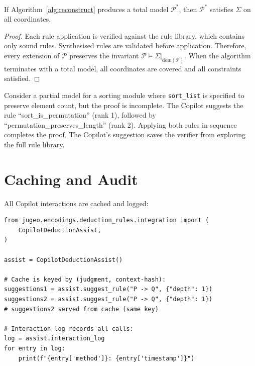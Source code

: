 \documentclass[11pt]{article}
\newcommand{\partmodel}{\mathcal{P}}
\begin{document}
\begin{theorem}\label{thm:recon-sound}
If Algorithm~\ref{alg:reconstruct} produces a total model $\partmodel^*$,
then $\partmodel^*$ satisfies $\Sigma$ on all coordinates.
\end{theorem}

\begin{proof}
Each rule application is verified against the rule library, which contains
only sound rules.  Synthesised rules are validated before application.
Therefore, every extension of $\partmodel$ preserves the invariant
$\partmodel \models \Sigma|_{\mathrm{dom}(\partmodel)}$.  When the algorithm
terminates with a total model, all coordinates are covered and all
constraints satisfied.
\end{proof}

\begin{example}\label{ex:sort-recon}
Consider a partial model for a sorting module where \texttt{sort\_list} is
specified to preserve element count, but the proof is incomplete.  The Copilot
suggests the rule ``sort\_is\_permutation'' (rank 1), followed by
``permutation\_preserves\_length'' (rank 2).  Applying both rules in sequence
completes the proof.  The Copilot's suggestion saves the verifier from
exploring the full rule library.
\end{example}

\section{Caching and Audit}\label{sec:caching}

All Copilot interactions are cached and logged:

\begin{lstlisting}[style=jugeo-python]
from jugeo.encodings.deduction_rules.integration import (
    CopilotDeductionAssist,
)

assist = CopilotDeductionAssist()

# Cache is keyed by (judgment, context-hash):
suggestions1 = assist.suggest_rule("P -> Q", {"depth": 1})
suggestions2 = assist.suggest_rule("P -> Q", {"depth": 1})
# suggestions2 served from cache (same key)

# Interaction log records all calls:
log = assist.interaction_log
for entry in log:
    print(f"{entry['method']}: {entry['timestamp']}")
\end{lstlisting}
\end{document}

